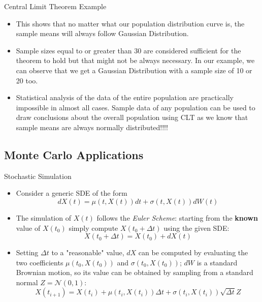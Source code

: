 \documentclass{beamer}
\begin{document}
\begin{frame}{Central Limit Theorem Example}
\begin{itemize}
    \item This shows that no matter what our population distribution curve is, the sample means will always follow Gaussian Distribution.
    \item Sample sizes equal to or greater than 30 are considered sufficient for the theorem to hold but that might not be always necessary. In our example, we can observe that we get a Gaussian Distribution with a sample size of 10 or 20 too.
    \item Statistical analysis of the data of the entire population are practically impossible in almost all cases. Sample data of any population can be used to draw conclusions about the overall population using CLT as we know that sample means are always normally distributed!!!!
\end{itemize}
\end{frame}

\subsection{Monte Carlo Applications}
\begin{frame}{Stochastic Simulation}
\begin{itemize}
    \item Consider a generic SDE of the form  
        \begin{equation*}
        dX(t) = \mu(t,X(t))dt + \sigma(t,X(t))dW(t) 
        \end{equation*}
    \item The simulation of $X(t)$ follows the \emph{Euler Scheme}: starting from the \textbf{known} value of $X(t_0)$ simply compute $X(t_0 +\Delta t)$ using the given SDE:
        \begin{equation*}
            X(t_0+\Delta t) = X(t_0) + dX(t)
        \end{equation*}
    \item Setting $\Delta t$ to a "reasonable" value, $dX$ can be computed by evaluating the two coefficients $\mu(t_0,X(t_0))$ and $\sigma(t_0,X(t_0))$; $dW$ is a standard Brownian motion, so its value can be obtained by sampling from a standard normal $Z=\mathcal{N}(0,1)$:
        \begin{equation*}
            X(t_{i+1}) = X(t_i) + \mu(t_i,X(t_i))\Delta t + \sigma(t_i,X(t_i))\sqrt{\Delta t}Z 
        \end{equation*}
    \end{itemize}
\end{frame}
\end{document}
